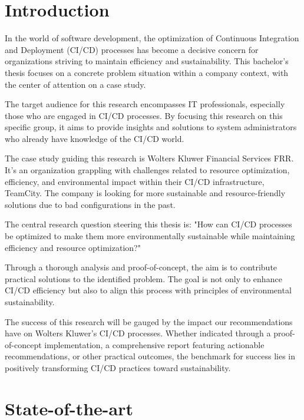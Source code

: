 
\section{Introduction}%
\label{sec:introduction}
In the world of software development, the optimization of Continuous Integration and Deployment (CI/CD) processes has become a decisive concern for organizations striving to maintain efficiency and sustainability. This bachelor's thesis focuses on a concrete problem situation within a company context, with the center of attention on a case study.

The target audience for this research encompasses IT professionals, especially those who are engaged in CI/CD processes. By focusing this research on this specific group, it aims to provide insights and solutions to system administrators who already have knowledge of the CI/CD world.

The case study guiding this research is Wolters Kluwer Financial Services FRR. It's an organization grappling with challenges related to resource optimization, efficiency, and environmental impact within their CI/CD infrastructure, TeamCity. The company is looking for more sustainable and resource-friendly solutions due to bad configurations in the past.

The central research question steering this thesis is: "How can CI/CD processes be optimized to make them more environmentally sustainable while maintaining efficiency
and resource optimization?"

Through a thorough analysis and proof-of-concept, the aim is to contribute practical solutions to the identified problem. The goal is not only to enhance CI/CD efficiency but also to align this process with principles of environmental sustainability.

The success of this research will be gauged by the impact our recommendations have on Wolters Kluwer's CI/CD processes. Whether indicated through a proof-of-concept implementation, a comprehensive report featuring actionable recommendations, or other practical outcomes, the benchmark for success lies in positively transforming CI/CD practices toward sustainability.

\section{State-of-the-art}%
\label{sec:state-of-the-art}

